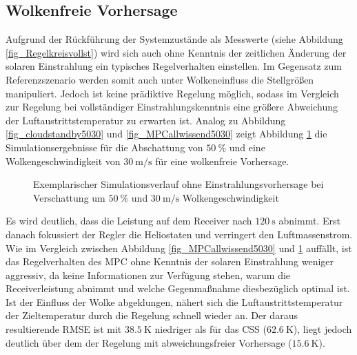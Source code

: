 \subsection{Wolkenfreie Vorhersage} \label{subsec_wolkenfreivorhergesagt}
Aufgrund der Rückführung der Systemzustände als Messwerte (siehe Abbildung \ref{fig_Regelkreisvollst}) wird sich auch ohne Kenntnis der zeitlichen Änderung der solaren Einstrahlung ein typisches Regelverhalten einstellen.
Im Gegensatz zum Referenzszenario werden somit auch unter Wolkeneinfluss die Stellgrößen manipuliert.
Jedoch ist keine prädiktive Regelung möglich, sodass im Vergleich zur Regelung bei vollständiger Einstrahlungskenntnis eine größere Abweichung der Luftaustrittstemperatur zu erwarten ist.
Analog zu Abbildung \ref{fig_cloudstandby5030} und \ref{fig_MPCallwissend5030} zeigt Abbildung \ref{fig_unwissend5030} die Simulationsergebnisse für die Abschattung von $\SI{50}{\percent}$ und eine Wolkengeschwindigkeit von $\SI{30}{\metre\per\second}$ für eine wolkenfreie Vorhersage.

\begin{figure}[h!]
    \centering
    \setlength{\fboxsep}{1pt}
    \setlength{\fboxrule}{1pt}
    \caption[Exemplarischer Simulationsverlauf ohne Einstrahlungsvorhersage bei Verschattung um $\SI{50}{\percent}$ und $\SI{30}{\metre\per\second}$ Wolkengeschwindigkeit]{Exemplarischer Simulationsverlauf ohne Einstrahlungsvorhersage bei Verschattung um $\SI{50}{\percent}$ und $\SI{30}{\metre\per\second}$ Wolkengeschwindigkeit}
    \label{fig_unwissend5030}
\end{figure}

Es wird deutlich, dass die Leistung auf dem Receiver nach $\SI{120}{\second}$ abnimmt.
Erst danach fokussiert der Regler die Heliostaten und verringert den Luftmassenstrom.
Wie im Vergleich zwischen Abbildung  \ref{fig_MPCallwissend5030} und \ref{fig_unwissend5030} auffällt, ist das Regelverhalten des MPC ohne Kenntnis der solaren Einstrahlung weniger aggressiv, da keine Informationen zur Verfügung stehen, warum die Receiverleistung abnimmt und welche Gegenmaßnahme diesbezüglich optimal ist.
Ist der Einfluss der Wolke abgeklungen, nähert sich die Luftaustrittstemperatur der Zieltemperatur durch die Regelung schnell wieder an.
Der daraus resultierende RMSE ist mit $\SI{38.5}{\kelvin}$ niedriger als für das CSS ($\SI{62.6}{\kelvin}$), liegt jedoch deutlich über dem der Regelung mit abweichungsfreier Vorhersage ($\SI{15.6}{\kelvin}$).

